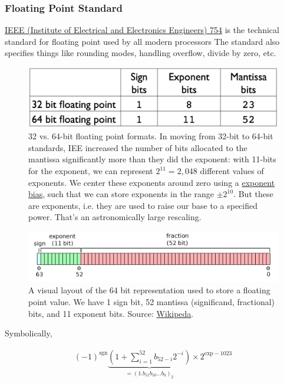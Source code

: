 \documentclass[12pt,letterpaper,twoside]{article}
\begin{document}
\subsubsection{Floating Point Standard}
\href{https://en.wikipedia.org/wiki/IEEE_754}
{IEEE (Institute of Electrical and Electronics Engineers) 754} is the
technical standard for floating point used by all modern processors
The standard also specifies things like rounding modes, handling overflow,
divide by zero, etc. 

\begin{figure}[h]
\centering
\includegraphics[scale=0.4]{fig/float-table.png}
\caption{\footnotesize 32 vs. 64-bit floating point formats.
  In moving from 32-bit to 64-bit standards, IEE
  increased the number of bits allocated to the mantissa significantly
  more than they did the exponent: with 11-bits for the
  exponent, we can represent $2^{11} = 2,048$ different values of
  exponents. We center these exponents around zero using a
  \href{https://en.wikipedia.org/wiki/Exponent_bias}{exponent bias},
  such that we can store exponents in the range $\pm 2^{10}$. But
  these are exponents, i.e. they are used to raise our base to a
  specified power. That's an astronomically
  large rescaling.}
\end{figure}

\begin{figure}[h]
  \centering
  \includegraphics[scale=0.45]{fig/IEEE_754}
  \caption{\footnotesize A visual layout of the 64 bit representation used to store
    a floating point value. We have 1 sign bit, 52 mantissa
(significand, fractional) bits, and 11 exponent bits. Source: \href{https://en.wikipedia.org/wiki/Double-precision_floating-point_format}{Wikipeda}.}
\end{figure}

Symbolically, 

\begin{align*}
  (-1)^{\textrm{sgn}} \underbrace{\left(1 + \sum_{i=1}^{52} b_{52-i} 2^{-i}
  \right)}_{= \left(1.b_{51} b_{50} \ldots b_0\right)_2} \times 2^{\textrm{exp} - 1023}
\end{align*}
\end{document}
